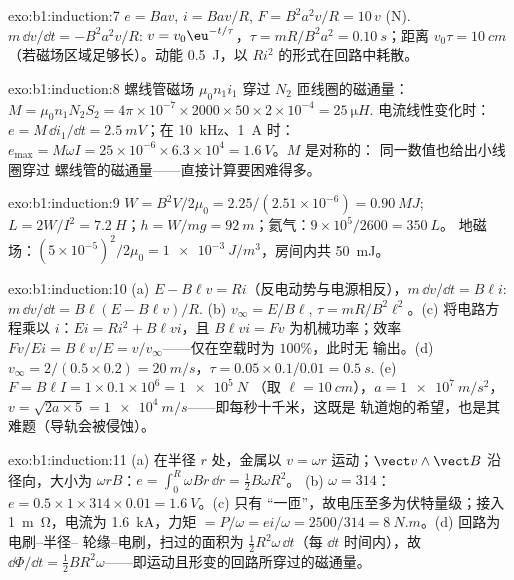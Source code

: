 \begin{solution}{exo:b1:induction:7}
$e = Bav$, $i = Bav/R$, $F = B^2a^2v/R = 10\,v$ (N). $m\,\dd v/\dd t = -B^2a^2v/R$:
$v = v_0\eu^{-t/\tau}$，$\tau = mR/B^2a^2 = \qty{0.10}{s}$；距离 $v_0\tau =
\qty{10}{cm}$（若磁场区域足够长）。动能
\qty{0.5}{J}，以 $Ri^2$ 的形式在回路中耗散。
\end{solution}

\begin{solution}{exo:b1:induction:8}
螺线管磁场 $\mu_0n_1i_1$ 穿过 $N_2$ 匝线圈的磁通量：$M =
\mu_0n_1N_2S_2 = 4\pi \times 10^{-7} \times 2000 \times 50 \times 2 \times 10^{-4} = \qty{25}{\micro H}$.
电流线性变化时：$e = M\,\dd i_1/\dd t = \qty{2.5}{mV}$；在 \qty{10}{kHz}、\qty{1}{A} 时：$e_{\max} =
M\omega I = 25 \times 10^{-6} \times 6.3 \times 10^4 = \qty{1.6}{V}$。$M$ 是对称的：
同一数值也给出小线圈穿过
螺线管的磁通量——直接计算要困难得多。
\end{solution}

\begin{solution}{exo:b1:induction:9}
$W = B^2V/2\mu_0 = 2.25/(2.51 \times 10^{-6}) = \qty{0.90}{MJ}$; $L = 2W/I^2 =
\qty{7.2}{H}$；$h = W/mg = \qty{92}{m}$；氦气：$9 \times 10^5/2600 = \qty{350}{L}$。
地磁场：$(5 \times 10^{-5})^2/2\mu_0 = \qty{1e-3}{J/m^3}$，房间内共
\qty{50}{mJ}。
\end{solution}

\begin{solution}{exo:b1:induction:10}
(a) $E - B\ell v = Ri$（反电动势与电源相反），$m\,\dd v/\dd t =
B\ell i$: $m\,\dd v/\dd t = B\ell(E - B\ell v)/R$. (b) $v_\infty = E/B\ell$, $\tau =
mR/B^2\ell^2$。(c) 将电路方程乘以 $i$：$Ei = Ri^2 +
B\ell vi$，且 $B\ell vi = Fv$ 为机械功率；效率 $Fv/Ei =
B\ell v/E = v/v_\infty$——仅在空载时为 $100\%$，此时无
输出。(d) $v_\infty = 2/(0.5 \times 0.2) = \qty{20}{m/s}$，$\tau = 0.05 \times
0.1/0.01 = \qty{0.5}{s}$. (e) $F = B\ell I = 1 \times 0.1 \times 10^6 = \qty{1e5}{N}$
（取 $\ell = \qty{10}{cm}$），$a = \qty{1e7}{m/s^2}$，$v = \sqrt{2a \times 5} =
\qty{1e4}{m/s}$——即每秒十千米，这既是
轨道炮的希望，也是其难题（导轨会被侵蚀）。
\end{solution}

\begin{solution}{exo:b1:induction:11}
(a) 在半径 $r$ 处，金属以 $v = \omega r$ 运动；$\vect v\wedge\vect B$ 沿
径向，大小为 $\omega rB$：$e = \int_0^R\omega Br\,\dd r = \tfrac12B\omega R^2$。
(b) $\omega = 314$：$e = 0.5 \times 1 \times 314 \times 0.01 = \qty{1.6}{V}$。(c) 只有
“一匝”，故电压至多为伏特量级；接入 \qty{1}{m\ohm}，电流为 \qty{1.6}{kA}，力矩
$= P/\omega = ei/\omega = 2500/314 = \qty{8}{N.m}$。(d) 回路为电刷–半径--
轮缘–电刷，扫过的面积为 $\tfrac12R^2\omega\,\dd t$（每 $\dd t$ 时间内），故 $\dd\Phi/\dd t =
\tfrac12BR^2\omega$——即运动且形变的回路所穿过的磁通量。
\end{solution}


